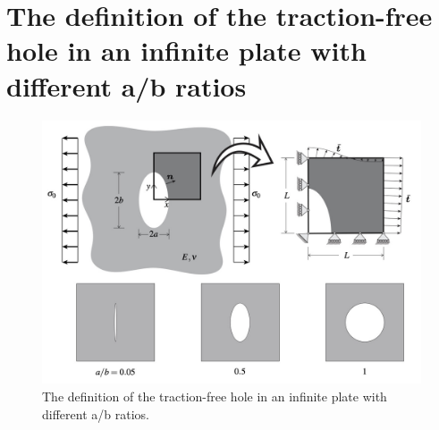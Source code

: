 \documentclass[twoside,twocolumn,10pt]{article}
\begin{document}
\section{The definition of the traction-free hole in an infinite plate with different a/b ratios}
\label{Apdx:Q2}
\begin{figure}[!ht]
  \centering
  \includegraphics[width=1.\linewidth]{Q2_1/Q2.jpg}
  \caption{The definition of the traction-free hole in an infinite plate with different a/b ratios.}
  \label{fig:Q2}
\end{figure}
\end{document}
